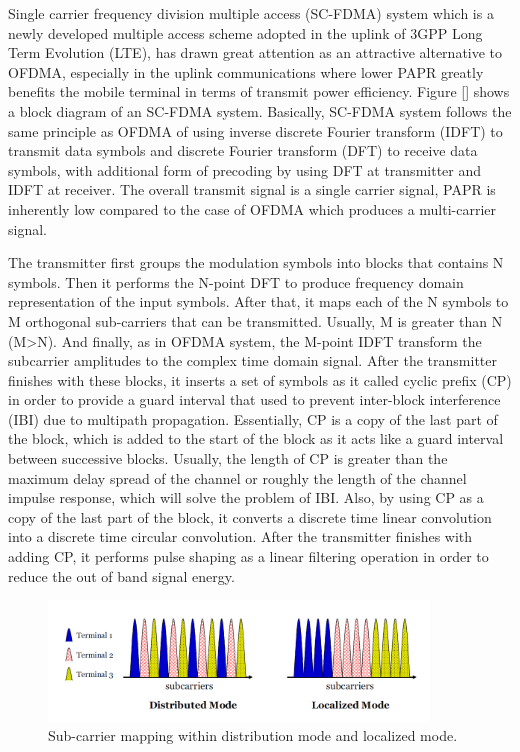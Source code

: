 \documentclass[12pt,a4paper,notitlepage,twoside,headsepline]{scrartcl}
\begin{document}
Single carrier frequency division multiple access (SC-FDMA) system which is a newly developed multiple access scheme adopted in the uplink of 3GPP Long Term Evolution (LTE),  has drawn great attention as an attractive alternative to OFDMA, especially in the uplink communications where lower PAPR greatly benefits the mobile terminal in terms of transmit power efficiency. Figure [] shows a block diagram of an SC-FDMA system. Basically, SC-FDMA system follows the same principle as OFDMA of using inverse discrete Fourier transform (IDFT) to transmit data symbols and discrete Fourier transform (DFT) to receive data symbols, with additional form of precoding by using DFT at transmitter and IDFT at receiver. The overall transmit signal is a single carrier signal, PAPR is inherently low compared to the case of OFDMA which produces a multi-carrier signal. 

The transmitter first groups the modulation symbols into blocks that contains N symbols. Then it performs the N-point DFT to produce frequency domain representation of the input symbols. After that, it maps each of the N symbols to M orthogonal sub-carriers that can be transmitted. Usually, M is greater than N (M>N). And finally, as in OFDMA system, the M-point IDFT transform the subcarrier amplitudes to the complex time domain signal. After the transmitter finishes with these blocks, it inserts a set of symbols as it called cyclic prefix (CP) in order to provide a guard interval that used to prevent inter-block interference (IBI) due to multipath propagation. Essentially, CP is a copy of the last part of the block, which is added to the start of the block as it acts like a guard interval between successive blocks. Usually, the length of CP is greater than the maximum delay spread of the channel or roughly the length of the channel impulse response, which will solve the problem of IBI. Also, by using CP as a copy of the last part of the block, it converts a discrete time linear convolution into a discrete time circular convolution. After the transmitter finishes with adding CP, it performs pulse shaping as a linear filtering operation in order to reduce the out of band signal energy.

\begin{figure}[!ht]
\begin{center}
\includegraphics[width=0.9\textwidth]{figures/fig2}
\end{center}
\caption{Sub-carrier mapping within distribution mode and localized mode.} %
\label{fig:example}
\end{figure}
\end{document}
